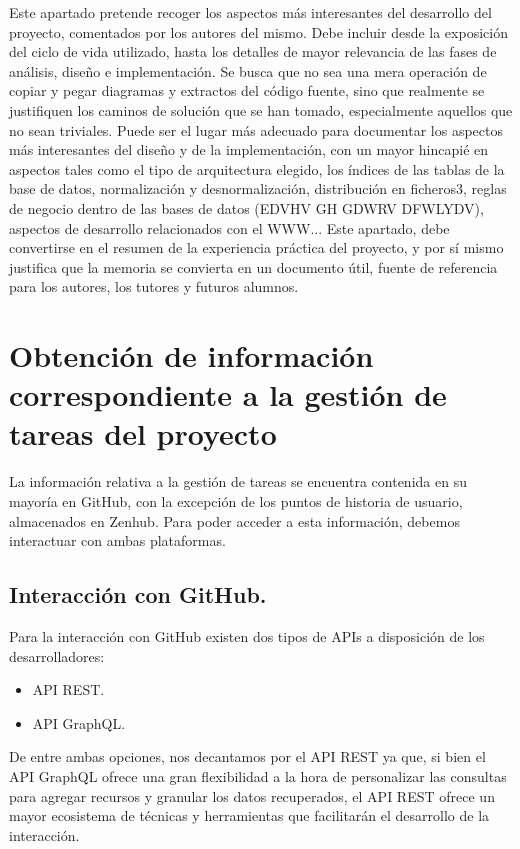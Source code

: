 
Este apartado pretende recoger los aspectos más interesantes del desarrollo del proyecto, comentados por los autores del mismo.
Debe incluir desde la exposición del ciclo de vida utilizado, hasta los detalles de mayor relevancia de las fases de análisis, diseño e implementación.
Se busca que no sea una mera operación de copiar y pegar diagramas y extractos del código fuente, sino que realmente se justifiquen los caminos de solución que se han tomado, especialmente aquellos que no sean triviales.
Puede ser el lugar más adecuado para documentar los aspectos más interesantes del diseño y de la implementación, con un mayor hincapié en aspectos tales como el tipo de arquitectura elegido, los índices de las tablas de la base de datos, normalización y desnormalización, distribución en ficheros3, reglas de negocio dentro de las bases de datos (EDVHV GH GDWRV DFWLYDV), aspectos de desarrollo relacionados con el WWW...
Este apartado, debe convertirse en el resumen de la experiencia práctica del proyecto, y por sí mismo justifica que la memoria se convierta en un documento útil, fuente de referencia para los autores, los tutores y futuros alumnos.

\section{Obtención de información correspondiente a la gestión de tareas del proyecto}

La información relativa a la gestión de tareas se encuentra contenida en su mayoría en GitHub, con la excepción de los puntos de historia de usuario, almacenados en Zenhub. Para poder acceder a esta información, debemos interactuar con ambas plataformas.

\subsection{Interacción con GitHub.}

Para la interacción con GitHub existen dos tipos de APIs a disposición de los desarrolladores:

\begin{itemize}
  \item API REST.
  \item API GraphQL.
\end{itemize}

De entre ambas opciones, nos decantamos por el API REST ya que, si bien el API GraphQL ofrece una gran flexibilidad a la hora de personalizar las consultas para agregar recursos y granular los datos recuperados, el API REST ofrece un mayor ecosistema de técnicas y herramientas que facilitarán el desarrollo de la interacción.

